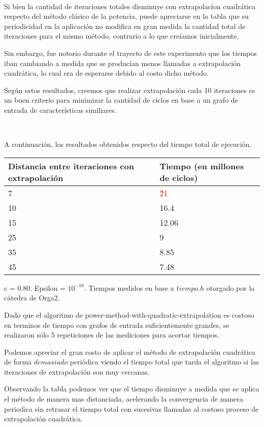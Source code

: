 ~

Si bien la cantidad de iteraciones totales disminuye con extrapolac\'ion cuadr\'atica respecto del m\'etodo cl\'asico de la potencia, puede apreciarse en la tabla que su periodicidad en la aplicaci\'on no modifica en gran medida la cantidad total de iteraciones para el mismo m\'etodo, contrario a lo que cre\'iamos inicialmente. 

Sin embargo, fue notorio durante el trayecto de este experimento que los tiempos iban cambiando a medida que se produc\'ian menos llamadas a extrapolaci\'on cuadr\'atica, lo cual era de esperarse debido al costo dicho m\'etodo.

Seg\'un estos resultados, creemos que realizar extrapolaci\'on cada 10 iteraciones es un buen criterio para minimizar la cantidad de ciclos en base a un grafo de entrada de caracter\'isticas similiares.

~

A continuaci\'on, los resultados obtenidos respecto del tiempo total de ejecuci\'on. 


\begin{center}
    \small{
    \begin{tabular}{| l | l |}
    \hline
    Distancia entre iteraciones con extrapolaci\'on & Tiempo (en millones de ciclos) \\ \hline
    7 & \textcolor{red}{\~21} \\ \hline
    10 & 16.4 \\ \hline
    15 & 12.06 \\ \hline
    25 & 9 \\ \hline
    35 & 8.85 \\ \hline
    45 & 7.48 \\ \hline
    
    \end{tabular}
    }
\end{center}
\begin{center}
c = 0.80. Epsilon = $10^{-10}$. Tiempos medidos en base a $tiempo.h$ otorgado por la c\'atedra de Orga2.
\end{center}

Dado que el algoritmo de power-method-with-quadratic-extrapolation es costoso en terminos de tiempo con grafos de entrada suficientemente grandes, se realizaron s\'olo 5 repeticiones de las mediciones para acortar tiempos. 

Podemos apreciar el gran costo de aplicar el m\'etodo de extrapolaci\'on cuadr\'atica de forma $demasiado$ peri\'odica viendo el tiempo total que tarda el algoritmo si las iteraciones de extrapolaci\'on son muy cercanas.

Observando la tabla podemos ver que el tiempo disminuye a medida que se aplica el m\'etodo de manera mas distanciada, acelerando la convergencia de manera periodica sin retrasar el tiempo total con sucesivas llamadas al costoso proceso de extrapolaci\'on cuadr\'atica.






